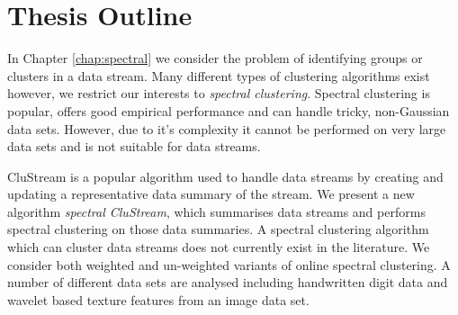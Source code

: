 


\section{Thesis Outline}
\label{sec:outline}

In Chapter \ref{chap:spectral} we consider the problem of identifying groups or clusters in a data stream. Many different types of clustering algorithms exist however, we restrict our interests to \textit{spectral clustering}.  Spectral clustering is popular, offers good empirical performance and can handle tricky, non-Gaussian data sets. However, due to it's complexity it cannot be performed on very large data sets and is not suitable for data streams.

CluStream \citep{Aggarwal2003} is a popular algorithm used to handle data streams by creating and updating a representative data summary of the stream. We present a new algorithm \textit{spectral CluStream}, which summarises data streams and performs spectral clustering on those data summaries. A spectral clustering algorithm which can cluster data streams does not currently exist in the literature. We consider both weighted and un-weighted variants of online spectral clustering. A number of different data sets are analysed including handwritten digit data and wavelet based texture features from an image data set.

